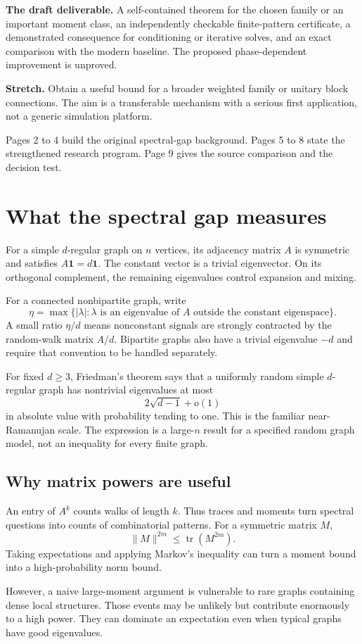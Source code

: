 \documentclass[11pt,letterpaper]{article}
\newcommand{\Page}[1]{\clearpage\section*{#1}}
\newcommand{\Sub}[1]{\subsection*{#1}}
\begin{document}
\textbf{The draft deliverable.} A self-contained theorem for the chosen family or an important moment class, an independently checkable finite-pattern certificate, a demonstrated consequence for conditioning or iterative solves, and an exact comparison with the modern baseline. The proposed phase-dependent improvement is unproved.

\textbf{Stretch.} Obtain a useful bound for a broader weighted family or unitary block connections. The aim is a transferable mechanism with a serious first application, not a generic simulation platform.

Pages 2 to 4 build the original spectral-gap background. Pages 5 to 8 state the strengthened research program. Page 9 gives the source comparison and the decision test.

\Page{What the spectral gap measures}

For a simple $d$-regular graph on $n$ vertices, its adjacency matrix $A$ is symmetric and satisfies $A\mathbf1=d\mathbf1$. The constant vector is a trivial eigenvector. On its orthogonal complement, the remaining eigenvalues control expansion and mixing.

For a connected nonbipartite graph, write
\[
 \eta=\max\{|\lambda|:\lambda\text{ is an eigenvalue of }A
                 \text{ outside the constant eigenspace}\}.
\]
A small ratio $\eta/d$ means nonconstant signals are strongly contracted by the random-walk matrix $A/d$. Bipartite graphs also have a trivial eigenvalue $-d$ and require that convention to be handled separately.

For fixed $d\geq3$, Friedman's theorem says that a uniformly random simple $d$-regular graph has nontrivial eigenvalues at most
\[
 2\sqrt{d-1}+o(1)
\]
in absolute value with probability tending to one. This is the familiar near-Ramanujan scale. The expression is a large-$n$ result for a specified random graph model, not an inequality for every finite graph.

\Sub{Why matrix powers are useful}
An entry of $A^k$ counts walks of length $k$. Thus traces and moments turn spectral questions into counts of combinatorial patterns. For a symmetric matrix $M$,
\[
 \|M\|^{2m}\leq\operatorname{tr}(M^{2m}).
\]
Taking expectations and applying Markov's inequality can turn a moment bound into a high-probability norm bound.

However, a naive large-moment argument is vulnerable to rare graphs containing dense local structures. Those events may be unlikely but contribute enormously to a high power. They can dominate an expectation even when typical graphs have good eigenvalues.
\end{document}
